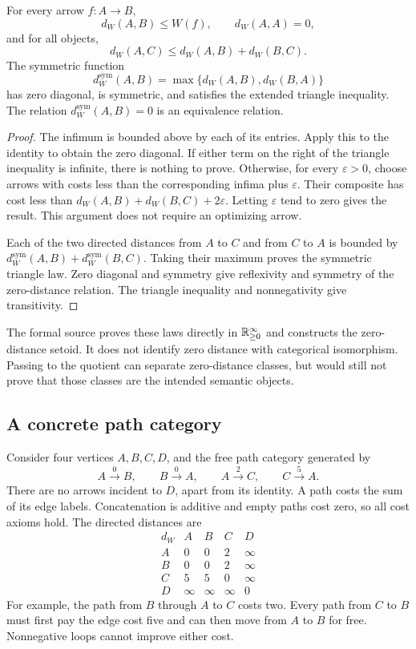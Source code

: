 \begin{KSproposition}\label{KS:KS78}
For every arrow \(f:A\to B\),
\[
 d_W(A,B)\le W(f),\qquad d_W(A,A)=0,
\]
and for all objects,
\[
 d_W(A,C)\le d_W(A,B)+d_W(B,C).
\]
The symmetric function
\[
 d_W^{\mathrm{sym}}(A,B)=\max\{d_W(A,B),d_W(B,A)\}
\]
has zero diagonal, is symmetric, and satisfies the extended triangle inequality. The relation \(d_W^{\mathrm{sym}}(A,B)=0\) is an equivalence relation.
\end{KSproposition}
\begin{proof}
The infimum is bounded above by each of its entries. Apply this to the identity to obtain the zero diagonal. If either term on the right of the triangle inequality is infinite, there is nothing to prove. Otherwise, for every \(\varepsilon>0\), choose arrows with costs less than the corresponding infima plus \(\varepsilon\). Their composite has cost less than
\(d_W(A,B)+d_W(B,C)+2\varepsilon\). Letting \(\varepsilon\) tend to zero gives the result. This argument does not require an optimizing arrow.

Each of the two directed distances from \(A\) to \(C\) and from \(C\) to \(A\) is bounded by \(d_W^{\mathrm{sym}}(A,B)+d_W^{\mathrm{sym}}(B,C)\). Taking their maximum proves the symmetric triangle law. Zero diagonal and symmetry give reflexivity and symmetry of the zero-distance relation. The triangle inequality and nonnegativity give transitivity.
\end{proof}
The formal source proves these laws directly in \(\mathbb R_{\ge0}^{\infty}\) and constructs the zero-distance setoid. It does not identify zero distance with categorical isomorphism. Passing to the quotient can separate zero-distance classes, but would still not prove that those classes are the intended semantic objects.

\subsection{A concrete path category}
Consider four vertices \(A,B,C,D\), and the free path category generated by
\[
 A\xrightarrow{0}B,\qquad B\xrightarrow{0}A,\qquad
 A\xrightarrow{2}C,\qquad C\xrightarrow{5}A.
\]
There are no arrows incident to \(D\), apart from its identity. A path costs the sum of its edge labels. Concatenation is additive and empty paths cost zero, so all cost axioms hold. The directed distances are
\[
 \begin{array}{c|rrrr}
 d_W&A&B&C&D\\\hline
 A&0&0&2&\infty\\
 B&0&0&2&\infty\\
 C&5&5&0&\infty\\
 D&\infty&\infty&\infty&0
 \end{array}
\]
For example, the path from \(B\) through \(A\) to \(C\) costs two. Every path from \(C\) to \(B\) must first pay the edge cost five and can then move from \(A\) to \(B\) for free. Nonnegative loops cannot improve either cost.

